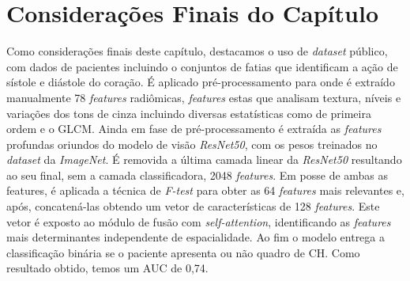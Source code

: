 \section{Considerações Finais do Capítulo}
\label{sec:cap4_consideracoes_finais}

Como considerações finais deste capítulo, destacamos o uso de \textit{dataset} público, com dados de pacientes incluindo o conjuntos de fatias que identificam a ação de sístole e diástole do coração. É aplicado pré-processamento para onde é extraído manualmente 78 \textit{features} radiômicas, \textit{features} estas que analisam textura, níveis e variações dos tons de cinza incluindo diversas estatísticas como de primeira ordem e o \gls{GLCM}. Ainda em fase de pré-processamento é extraída as \textit{features} profundas oriundos do modelo de visão \textit{ResNet50}, com os pesos treinados no \textit{dataset} da \textit{ImageNet}. É removida a última camada linear da \textit{ResNet50} resultando ao seu final, sem a camada classificadora, 2048 \textit{features}. Em posse de ambas as features, é aplicada a técnica de \textit{F-test} para obter as 64 \textit{features} mais relevantes e, após, concatená-las obtendo um vetor de características de 128 \textit{features}. Este vetor é exposto ao módulo de fusão com \textit{self-attention}, identificando as \textit{features} mais determinantes independente de espacialidade. Ao fim o modelo entrega a classificação binária se o paciente apresenta ou não quadro de \gls{CH}. Como resultado obtido, temos um AUC de 0,74.